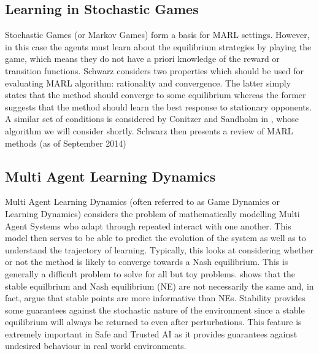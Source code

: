 \documentclass[.../main.tex]{subfiles}
\begin{document}
\subsection{Learning in Stochastic Games} \label{sec::Learning_Stochastic_Games}

Stochastic Games (or Markov Games) form a basis for MARL
settings. However, in this case the agents must learn about the
equilibrium strategies by playing the game, which means they do not
have a priori knowledge of the reward or transition functions. Schwarz
considers  two properties which should be used for evaluating MARL
algorithm: rationality and convergence. The latter simply states that
the method should converge to some equilibrium whereas the former
suggests that the method should learn the best response to stationary
opponents. A similar set of conditions is considered by Conitzer and
Sandholm in \cite{ConitzerAWESOME:}, whose algorithm we will consider
shortly. Schwarz then presents a review of MARL methods (as of
September 2014)


\subsection{Multi Agent Learning Dynamics} \label{sec::MARL_Dynamics}

Multi Agent Learning Dynamics (often referred to as Game Dynamics or
Learning Dynamics) considers the problem of mathematically modelling
Multi Agent Systems who adapt through repeated interact with one
another. This model then serves to be able to predict the evolution of
the system as well as to understand the trajectory of
learning. Typically, this looks at considering whether or not the
method is likely to converge towards a Nash equilibrium. This is
generally a difficult problem to solve
\cite{ShohamMultiagentFoundations} for all but toy problems.
\cite{Letcher2019DifferentiableMechanics} shows that the stable
equilbrium and Nash equilibrium (NE) are not necessarily the same and,
in fact, argue that stable points are more informative than NEs.
Stability provides some guarantees against the stochastic nature of
the environment since a stable equilibrium will always be returned to
even after perturbations. This feature is extremely important in Safe
and Trusted AI as it provides guarantees against undesired behaviour
in real world environments.
\end{document}
